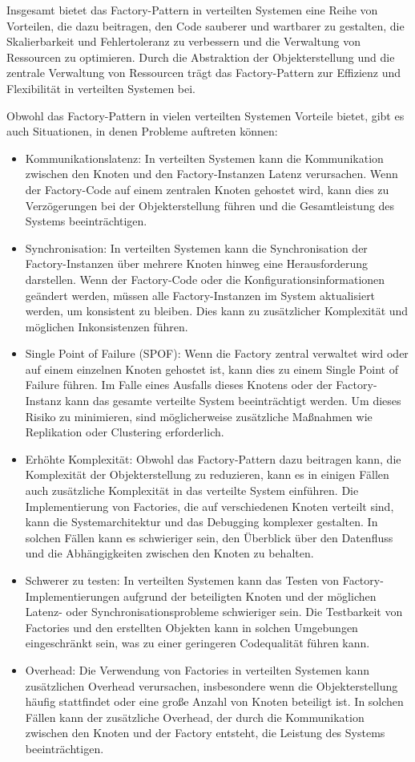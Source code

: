 Insgesamt bietet das Factory-Pattern in verteilten Systemen eine Reihe von Vorteilen, die dazu beitragen, den Code sauberer und wartbarer zu gestalten, die Skalierbarkeit und Fehlertoleranz zu verbessern und die Verwaltung von Ressourcen zu optimieren. Durch die Abstraktion der Objekterstellung und die zentrale Verwaltung von Ressourcen trägt das Factory-Pattern zur Effizienz und Flexibilität in verteilten Systemen bei.

Obwohl das Factory-Pattern in vielen verteilten Systemen Vorteile bietet, gibt es auch Situationen, in denen Probleme auftreten können:
\begin{itemize}
\item Kommunikationslatenz: In verteilten Systemen kann die Kommunikation zwischen den Knoten und den Factory-Instanzen Latenz verursachen. Wenn der Factory-Code auf einem zentralen Knoten gehostet wird, kann dies zu Verzögerungen bei der Objekterstellung führen und die Gesamtleistung des Systems beeinträchtigen.
\item Synchronisation: In verteilten Systemen kann die Synchronisation der Factory-Instanzen über mehrere Knoten hinweg eine Herausforderung darstellen. Wenn der Factory-Code oder die Konfigurationsinformationen geändert werden, müssen alle Factory-Instanzen im System aktualisiert werden, um konsistent zu bleiben. Dies kann zu zusätzlicher Komplexität und möglichen Inkonsistenzen führen.
\item Single Point of Failure (SPOF): Wenn die Factory zentral verwaltet wird oder auf einem einzelnen Knoten gehostet ist, kann dies zu einem Single Point of Failure führen. Im Falle eines Ausfalls dieses Knotens oder der Factory-Instanz kann das gesamte verteilte System beeinträchtigt werden. Um dieses Risiko zu minimieren, sind möglicherweise zusätzliche Maßnahmen wie Replikation oder Clustering erforderlich.
\item Erhöhte Komplexität: Obwohl das Factory-Pattern dazu beitragen kann, die Komplexität der Objekterstellung zu reduzieren, kann es in einigen Fällen auch zusätzliche Komplexität in das verteilte System einführen. Die Implementierung von Factories, die auf verschiedenen Knoten verteilt sind, kann die Systemarchitektur und das Debugging komplexer gestalten. In solchen Fällen kann es schwieriger sein, den Überblick über den Datenfluss und die Abhängigkeiten zwischen den Knoten zu behalten.
\item Schwerer zu testen: In verteilten Systemen kann das Testen von Factory-Implementierungen aufgrund der beteiligten Knoten und der möglichen Latenz- oder Synchronisationsprobleme schwieriger sein. Die Testbarkeit von Factories und den erstellten Objekten kann in solchen Umgebungen eingeschränkt sein, was zu einer geringeren Codequalität führen kann.
\item Overhead: Die Verwendung von Factories in verteilten Systemen kann zusätzlichen Overhead verursachen, insbesondere wenn die Objekterstellung häufig stattfindet oder eine große Anzahl von Knoten beteiligt ist. In solchen Fällen kann der zusätzliche Overhead, der durch die Kommunikation zwischen den Knoten und der Factory entsteht, die Leistung des Systems beeinträchtigen.
\end{itemize}

